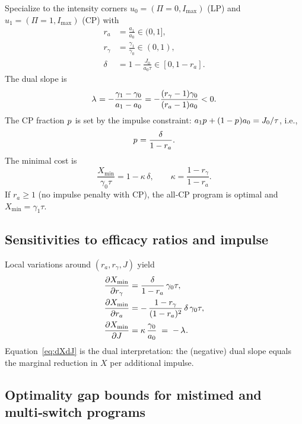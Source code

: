 \documentclass[aps,pre,twocolumn,showpacs,superscriptaddress]{revtex4-2}
\theoremstyle{definition}
\begin{document}
Specialize to the intensity corners $u_0=(\Pi=0,I_{\max})$ (LP) and $u_1=(\Pi=1,I_{\max})$ (CP) with
\begin{align}
r_a&=\frac{a_1}{a_0}\in(0,1],\\
r_\gamma&=\frac{\gamma_1}{\gamma_0}\in(0,1),\nonumber\\
\delta&=1-\frac{J_0}{a_0\tau}\in[0,1-r_a].\nonumber
\end{align}
The dual slope is
\begin{equation}\label{eq:lambda-star-4}
\lambda^{\*}=-\frac{\gamma_1-\gamma_0}{a_1-a_0}=-\frac{(r_\gamma-1)\gamma_0}{(r_a-1)a_0}<0.
\end{equation}
The CP fraction $p^{\*}$ is set by the impulse constraint: $a_1 p^{\*}+(1-p^{\*})a_0=J_0/\tau$, i.e.,
\begin{equation}\label{eq:pstar-4}
p^{\*}=\frac{\delta}{1-r_a}.
\end{equation}
The minimal cost is
\begin{equation}\label{eq:pareto-line-4}
\frac{X_{\min}}{\gamma_0\tau}=1-\kappa\,\delta,\qquad \kappa=\frac{1-r_\gamma}{1-r_a}.
\end{equation}
If $r_a\ge 1$ (no impulse penalty with CP), the all‑CP program is optimal and $X_{\min}=\gamma_1 \tau$.

\subsection{Sensitivities to efficacy ratios and impulse}\label{subsec:sensitivity4}

Local variations around $(r_a,r_\gamma,J)$ yield
\begin{align}
\frac{\partial X_{\min}}{\partial r_\gamma} &= \frac{\delta}{1-r_a}\,\gamma_0\tau, \label{eq:dXdr1}\\
\frac{\partial X_{\min}}{\partial r_a} &= -\,\frac{1-r_\gamma}{(1-r_a)^2}\,\delta\,\gamma_0\tau, \label{eq:dXdr2}\\
\frac{\partial X_{\min}}{\partial J} &= \kappa\,\frac{\gamma_0}{a_0} \;=\; -\,\lambda^{\*}. \label{eq:dXdJ}
\end{align}
Equation~\eqref{eq:dXdJ} is the dual interpretation: the (negative) dual slope equals the marginal reduction in $X$ per additional impulse.

\subsection{Optimality gap bounds for mistimed and multi‑switch programs}\label{subsec:gap4}
\end{document}
